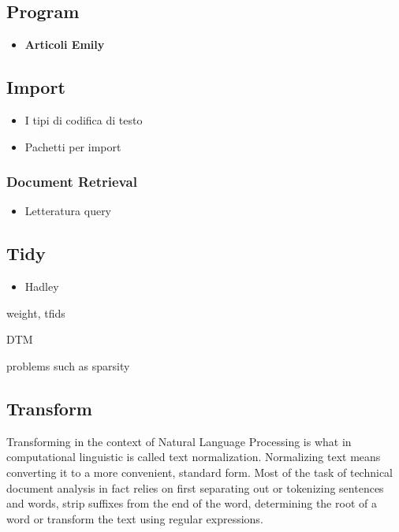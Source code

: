 \documentclass[]{book}
\providecommand{\tightlist}{%
  \setlength{\itemsep}{0pt}\setlength{\parskip}{0pt}}
\begin{document}
\subsection{Program}\label{sotatoolsprogram}

\begin{itemize}
\tightlist
\item
  \textbf{Articoli Emily}
\end{itemize}

\subsection{Import}\label{sotatoolsimport}

\begin{itemize}
\tightlist
\item
  I tipi di codifica di testo
\item
  Pachetti per import
\end{itemize}

\subsubsection{Document Retrieval}\label{sotatoolsimportretrieval}

\begin{itemize}
\tightlist
\item
  Letteratura query
\end{itemize}

\subsection{Tidy}\label{sotatoolstidy}

\begin{itemize}
\tightlist
\item
  Hadley
\end{itemize}

weight, tfids

DTM

problems such as sparsity

\subsection{Transform}\label{sotatoolstransform}

Transforming in the context of Natural Language Processing is what in
computational linguistic is called text normalization. Normalizing text
means converting it to a more convenient, standard form. Most of the
task of technical document analysis in fact relies on first separating
out or tokenizing sentences and words, strip suffixes from the end of
the word, determining the root of a word or transform the text using
regular expressions.
\end{document}
